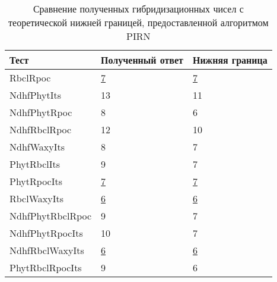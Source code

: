 \begin{table}[t]
\caption{Сравнение полученных гибридизационных чисел с теоретической нижней границей, предоставленной алгоритмом PIRN}
\centering
\begin{tabular}{l | l | l}
	Тест & Полученный ответ & Нижняя граница \\
	\hline
	RbclRpoc & \underline{7} & \underline{7} \\
	NdhfPhytIts & 13 & 11 \\
	NdhfPhytRpoc & 8 & 6 \\
	NdhfRbclRpoc & 12 & 10 \\
	NdhfWaxyIts & 8 & 7 \\
	PhytRbclIts & 9 & 7 \\
	PhytRpocIts & \underline{7} & \underline{7} \\
	RbclWaxyIts & \underline{6} & \underline{6} \\
	NdhfPhytRbclRpoc & 9 & 7 \\
	NdhfPhytRpocIts & 10 & 7 \\
	NdhfRbclWaxyIts & \underline{6} & \underline{6} \\
	PhytRbclRpocIts & 9 & 6 \\
\end{tabular}
\label{lower-bound-table}
\end{table}